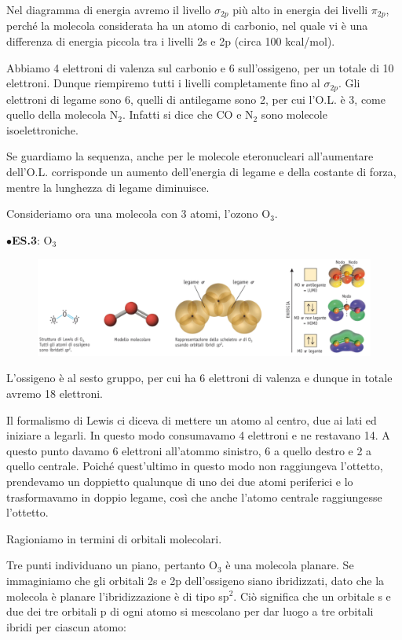Nel diagramma di energia avremo il livello $\sigma_{2p}$ più alto in energia dei livelli $\pi_{2p}$, perché la molecola considerata ha un atomo di carbonio, nel quale vi è una differenza di energia piccola tra i livelli 2s e 2p (circa 100 kcal/mol).

Abbiamo 4 elettroni di valenza sul carbonio e 6 sull'ossigeno, per un totale di 10 elettroni. Dunque riempiremo tutti i livelli completamente fino al $\sigma_{2p}$. Gli elettroni di legame sono 6, quelli di antilegame sono 2, per cui l'O.L. è 3, come quello della molecola N$_2$. Infatti si dice che CO e N$_2$ sono molecole isoelettroniche.

Se guardiamo la sequenza, anche per le molecole eteronucleari all'aumentare dell'O.L. corrisponde un aumento dell'energia di legame e della costante di forza, mentre la lunghezza di legame diminuisce.

\vspace{0.2cm}Consideriamo ora una molecola con 3 atomi, l'ozono O$_3$.

\vspace{0.2cm}$\bullet$\textbf{ES.3}: O$_3$

\begin{figure}[H]
    \centering
    \includegraphics[width=14cm]{immagini/orbitali_molecolari_O_3.png}
\end{figure}

L'ossigeno è al sesto gruppo, per cui ha 6 elettroni di valenza e dunque in totale avremo 18 elettroni.

Il formalismo di Lewis ci diceva di mettere un atomo al centro, due ai lati ed iniziare a legarli. In questo modo consumavamo 4 elettroni e ne restavano 14. A questo punto davamo 6 elettroni all'atommo sinistro, 6 a quello destro e 2 a quello centrale. Poiché quest'ultimo in questo modo non raggiungeva l'ottetto, prendevamo un doppietto qualunque di uno dei due atomi periferici e lo trasformavamo in doppio legame, così che anche l'atomo centrale raggiungesse l'ottetto.

Ragioniamo in termini di orbitali molecolari.

Tre punti individuano un piano, pertanto O$_3$ è una molecola planare. Se immaginiamo che gli orbitali 2s e 2p dell'ossigeno siano ibridizzati, dato che la molecola è planare l'ibridizzazione è di tipo sp$^2$. Ciò significa che un orbitale s e due dei tre orbitali p di ogni atomo si mescolano per dar luogo a tre orbitali ibridi per ciascun atomo:

